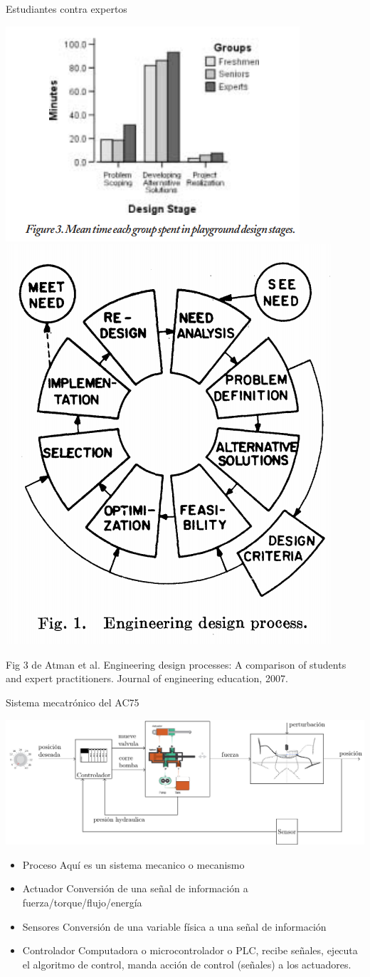 \documentclass[presentation,aspectratio=169]{beamer}
\begin{document}
\begin{frame}[label={sec:org808dc76}]{Estudiantes contra expertos}
\begin{center}
\includegraphics[width=0.5\linewidth]{../../figures/playground-design-student-experts.png}
\includegraphics[width=0.3\linewidth]{../../figures/design-process-fig1.png}
\end{center}
\footnotesize Fig 3 de Atman et al. Engineering design processes: A comparison of students and expert practitioners. Journal of engineering education, 2007.
\end{frame}

\begin{frame}[label={sec:orgdbcb4c5}]{Sistema mecatrónico del AC75}
\begin{center}
\includegraphics[width=.76\textwidth]{../../figures/ac75-control-block-details}
\end{center}

\begin{itemize}
\item \alert{Proceso} Aquí es un \alert{sistema mecanico} o \alert{mecanismo}
\item \alert{Actuador} Conversión de una señal de información a fuerza/torque/flujo/energía
\item \alert{Sensores}  Conversión de una variable física a una señal de información
\item \alert{Controlador} Computadora o microcontrolador o PLC, recibe señales, ejecuta el algoritmo de control, manda acción de control (señales) a los actuadores.
\end{itemize}
\end{frame}
\end{document}
